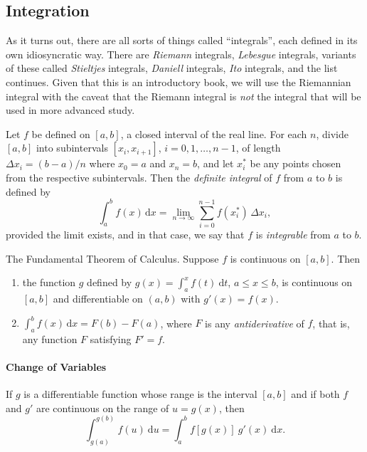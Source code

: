 \documentclass[captions=tableheading]{scrbook}
\begin{document}
\subsection{Integration}
\label{sec-21-2-4}

As it turns out, there are all sorts of things called ``integrals'', each defined in its own idiosyncratic way. There are \emph{Riemann} integrals, \emph{Lebesgue} integrals, variants of these called \emph{Stieltjes} integrals, \emph{Daniell} integrals, \emph{Ito} integrals, and the list continues. Given that this is an introductory book, we will use the Riemannian integral with the caveat that the Riemann integral is \emph{not} the integral that will be used in more advanced study.

\begin{defn}
Let \(f\) be defined on \([a,b]\), a closed interval of the real line. For each \(n\), divide \([a,b]\) into subintervals \([x_{i},x_{i+1}]\), \(i=0,1,\ldots,n-1\), of length \(\Delta x_{i}=(b-a)/n\) where \(x_{0}=a\) and \(x_{n}=b\), and let \(x_{i}^{\ast}\) be any points chosen from the respective subintervals. Then the \emph{definite integral} of \(f\) from \(a\) to \(b\) is defined by
\begin{equation}
\int_{a}^{b}f(x)\,\mathrm{d} x=\lim_{n\to\infty}\sum_{i=0}^{n-1}f(x_{i}^{\ast})\,\Delta x_{i},
\end{equation}
provided the limit exists, and in that case, we say that \(f\) is \emph{integrable} from \(a\) to \(b\). 
\end{defn}

\begin{thm}
The Fundamental Theorem of Calculus. Suppose \(f\) is continuous on \([a,b]\). Then
\begin{enumerate}
\item the function \(g\) defined by \(g(x)=\int_{a}^{x}f(t)\:\mathrm{d} t\), \(a\leq x\leq b\), is continuous on \([a,b]\) and differentiable on \((a,b)\) with \(g'(x)=f(x)\).
\item \(\int_{a}^{b}f(x)\,\mathrm{d} x=F(b)-F(a)\), where \(F\) is any \emph{antiderivative} of \(f\), that is, any function \(F\) satisfying \(F'=f\).
\end{enumerate}

\end{thm}


\paragraph*{Change of Variables}
\begin{thm}
If \(g\) is a differentiable function whose range is the interval \([a,b]\) and if both \(f\) and \(g'\) are continuous on the range of \(u = g(x)\), then
\begin{equation}
\int_{g(a)}^{g(b)}f(u)\:\mathrm{d} u=\int_{a}^{b}f[g(x)]\: g'(x)\:\mathrm{d} x.
\end{equation}
\end{thm}
\end{document}
